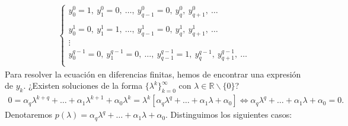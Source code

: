 \begin{align*}
    \left\{ \begin{array}{lcc}
                y_0^0 = 1,\ y_1^0 = 0,\ \ldots,\ y_{q-1}^0 = 0,\ y_q^0,\ y_{q+1}^0,\ \ldots                     \\
                \\ y_0^1 = 0,\ y_1^1 = 1,\ \ldots,\ y_{q-1}^1 = 0,\ y_q^1,\ y_{q+1}^1,\ \ldots\\
                \vdots                                                                                          \\
                y_0^{q-1} = 0,\ y_1^{q-1} = 0,\ \ldots,\ y_{q-1}^{q-1} = 1,\ y_q^{q-1},\ y_{q+1}^{q-1},\ \ldots \\
            \end{array}
    \right.
\end{align*}
Para resolver la ecuación en diferencias finitas, hemos de encontrar una expresión de $y_k$. ¿Existen soluciones de la forma $\{\lambda^k\}_{k=0}^{\infty}$ con $\lambda \in \mathbb{R} \backslash \{0\}$?
\begin{align*}
    0 = \alpha_q \lambda^{k+q} + \ldots+ \alpha_1 \lambda^{k+1} + \alpha_0 \lambda^{k} = \lambda^k[\alpha_q \lambda^{q} + \ldots + \alpha_1 \lambda + \alpha_0] \Longleftrightarrow \alpha_q \lambda^{q} + \ldots + \alpha_1 \lambda + \alpha_0 = 0.
\end{align*}
Denotaremos $p(\lambda) = \alpha_q \lambda^{q} + \ldots + \alpha_1 \lambda + \alpha_0$. Distinguimos los siguientes casos:
